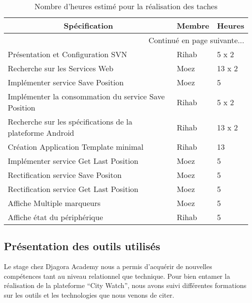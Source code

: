 \begin{center}
    \begin{longtable}{| l | l | l |}
        \caption{Nombre d'heures estimé pour la réalisation des taches}
        \label{tab:sprint1-estimation} \\

 \hline
 \multicolumn{1}{|c}{\textbf{Spécification}} &
 \multicolumn{1}{|c}{\textbf{Membre}} &
 \multicolumn{1}{|c|}{\textbf{Heures}} \\ \hline
 \endhead

 \hline \multicolumn{3}{|r|}{{Continué en page suivante$\dotsc$}} \\ \hline
 \endfoot

 \hline \hline
 \endlastfoot

\hline
Présentation et Configuration SVN & Rihab & 5 x 2 \\ \hline
Recherche sur les Services Web & Moez & 13 x 2 \\ \hline
Implémenter service Save Position & Moez & 5 \\ \hline
Implémenter la consommation du service Save Position & Rihab & 5 x 2 \\ \hline
Recherche sur les spécifications de la plateforme Android & Rihab & 13 x 2 \\ \hline
Création Application Template minimal & Rihab & 13 \\ \hline
Implémenter service Get Last Position & Moez & 5 \\ \hline
Rectification service Save Positon & Moez & 5 \\ \hline
Rectification service Get Last Position & Moez & 5 \\ \hline
Affiche Multiple marqueurs & Moez & 5 \\ \hline
Affiche état du périphérique & Rihab & 5 \\ \hline
\end{longtable}
\end{center}

\subsection{Présentation des outils utilisés}

Le stage chez Djagora Academy nous a permis d'acquérir de nouvelles
compétences tant au niveau relationnel que technique. Pour bien entamer la réalisation
de la plateforme ``City Watch'', nous avons suivi différentes
formations sur les outils et les technologies que nous venons de citer.

